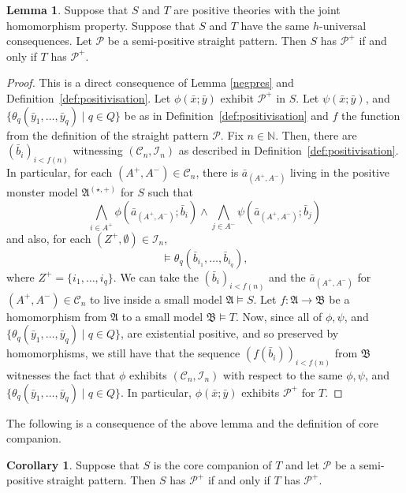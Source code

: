 \documentclass{amsart}
\theoremstyle{definition}
\newtheorem{lemma}[theorem]{Lemma}
\newtheorem{corollary}[theorem]{Corollary}
\theoremstyle{remark}
\numberwithin{equation}{section}
\newcommand{\fa}{\mathfrak{A}}
\newcommand{\fb}{\mathfrak{B}}
\begin{document}
\begin{lemma}\label{pospres} Suppose that $S$ and $T$ are positive theories with the joint homomorphism property. Suppose that $S$ and $T$ have the same $h$-universal consequences. Let $\mathcal{P}$ be a semi-positive straight pattern. Then
$S$ has $\mathcal{P}^+$ if and only if $T$ has $\mathcal{P}^+$.
\end{lemma}
\begin{proof}
    This is a direct consequence of Lemma \ref{negpres} and Definition~\ref{def:positivisation}. Let $\phi(\bar{x};\bar{y})$ exhibit $\mathcal{P}^+$ in $S$. Let $\psi(\bar{x};\bar{y})$, and  $\{\theta_q(\bar{y}_1, \dots, \bar{y}_q) \mid q\in Q\}$ be as in Definition~\ref{def:positivisation} and $f$ the function from the definition of the straight pattern ${\mathcal P}$. Fix $n\in\mathbb{N}$. Then, there are $(\bar{b}_i)_{i<f(n)}$ witnessing $(\mathcal{C}_n, \mathcal{I}_n)$ as described in Definition~\ref{def:positivisation}. In particular, for each $(A^+, A^-)\in\mathcal{C}_n$, there is $\bar{a}_{(A^+, A^-)}$ living in the positive monster model $\fa^{(\star, +)}$ for $S$ such that
\[
 \bigwedge_{i\in A^+} \phi(\bar{a}_{(A^+, A^-)}; \bar{b}_i)\wedge \bigwedge_{j\in A^-} \psi(\bar{a}_{(A^+, A^-)}; \bar{b}_j)
\]
and also, for each $(Z^+, \emptyset)\in\mathcal{I}_n$, 
\[ \vDash\theta_{q}(\bar{b}_{i_1}, \dots, \bar{b}_{i_q}),\]
where $Z^+=\{i_1, \dots, i_q\}$. We can take the $(\bar{b}_i)_{i<f(n)}$  and the $\bar{a}_{(A^+, A^-)}$ for $(A^+, A^-)\in\mathcal{C}_n$ to live inside a small model $\fa\models S$.  Let $f \colon \fa\to\fb$ be a homomorphism from $\fa$ to a small model $\fb\vDash T$. Now, since all of $\phi, \psi$, and $\{\theta_{q}(\bar{y}_1, \dots, \bar{y}_{q}) \mid q\in Q\}$,  are existential positive, and so preserved by homomorphisms, we still have that the sequence $(f(\bar{b}_i))_{i<f(n)}$ from $\fb$ witnesses the fact that $\phi$ exhibits $(\mathcal{C}_n, \mathcal{I}_n)$ with respect to the same  $\phi, \psi$,  and $\{\theta_{q}(\bar{y}_1, \dots, \bar{y}_q) \mid {q}\in Q\}$. In particular, $\phi(\bar{x};\bar{y})$ exhibits $\mathcal{P}^+$ for $T$.
\end{proof}
The following is a consequence of the above lemma and the definition of core companion.

\begin{corollary}\label{corepres} Suppose that $S$ is the core companion  of $T$ and let $\mathcal{P}$ be a semi-positive straight pattern. Then $S$ has $\mathcal{P}^+$ if and only if $T$ has $\mathcal{P}^+$.
\end{corollary}
\end{document}
